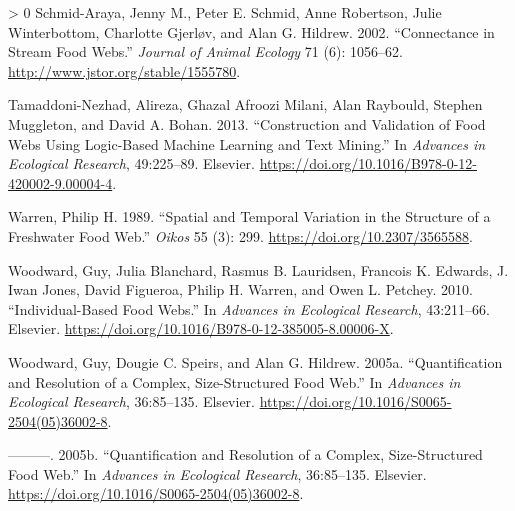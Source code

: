 \documentclass{article}
\newlength{\cslhangindent}
\newenvironment{CSLReferences}[3] %
 {%
  \setlength{\parindent}{0pt}
  \ifodd #1 \everypar{\setlength{\hangindent}{\cslhangindent}}\ignorespaces\fi
  \ifnum #2 > 0
  \setlength{\parskip}{#2\baselineskip}
  \fi
 }%
 {}
\begin{document}
\begin{CSLReferences}{1}{0}
\leavevmode\hypertarget{ref-schmid-arayaConnectanceStreamFood2002}{}%
Schmid-Araya, Jenny M., Peter E. Schmid, Anne Robertson, Julie
Winterbottom, Charlotte Gjerløv, and Alan G. Hildrew. 2002.
{``Connectance in {Stream Food Webs}.''} \emph{Journal of Animal
Ecology} 71 (6): 1056--62. \url{http://www.jstor.org/stable/1555780}.

\leavevmode\hypertarget{ref-tamaddoni-nezhadConstructionValidationFood2013}{}%
Tamaddoni-Nezhad, Alireza, Ghazal Afroozi Milani, Alan Raybould, Stephen
Muggleton, and David A. Bohan. 2013. {``Construction and {Validation} of
{Food Webs Using Logic}-{Based Machine Learning} and {Text Mining}.''}
In \emph{Advances in {Ecological Research}}, 49:225--89. {Elsevier}.
\url{https://doi.org/10.1016/B978-0-12-420002-9.00004-4}.

\leavevmode\hypertarget{ref-warrenSpatialTemporalVariation1989}{}%
Warren, Philip H. 1989. {``Spatial and {Temporal Variation} in the
{Structure} of a {Freshwater Food Web}.''} \emph{Oikos} 55 (3): 299.
\url{https://doi.org/10.2307/3565588}.

\leavevmode\hypertarget{ref-woodwardIndividualBasedFoodWebs2010}{}%
Woodward, Guy, Julia Blanchard, Rasmus B. Lauridsen, Francois K.
Edwards, J. Iwan Jones, David Figueroa, Philip H. Warren, and Owen L.
Petchey. 2010. {``Individual-{Based Food Webs}.''} In \emph{Advances in
{Ecological Research}}, 43:211--66. {Elsevier}.
\url{https://doi.org/10.1016/B978-0-12-385005-8.00006-X}.

\leavevmode\hypertarget{ref-woodwardQuantificationResolutionComplex2005}{}%
Woodward, Guy, Dougie C. Speirs, and Alan G. Hildrew. 2005a.
{``Quantification and {Resolution} of a {Complex}, {Size}-{Structured
Food Web}.''} In \emph{Advances in {Ecological Research}}, 36:85--135.
{Elsevier}. \url{https://doi.org/10.1016/S0065-2504(05)36002-8}.

\leavevmode\hypertarget{ref-woodwardQuantificationResolutionComplex2005a}{}%
---------. 2005b. {``Quantification and {Resolution} of a {Complex},
{Size}-{Structured Food Web}.''} In \emph{Advances in {Ecological
Research}}, 36:85--135. {Elsevier}.
\url{https://doi.org/10.1016/S0065-2504(05)36002-8}.

\end{CSLReferences}



\end{document}
